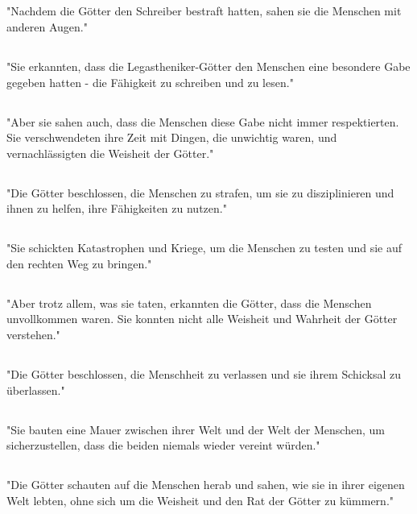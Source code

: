 \documentclass{article}
\begin{document}
\subsection{}
"Nachdem die Götter den Schreiber bestraft hatten, sahen sie die Menschen mit anderen Augen."
\subsection{}
"Sie erkannten, dass die Legastheniker-Götter den Menschen eine besondere Gabe gegeben hatten - die Fähigkeit zu schreiben und zu lesen."
\subsection{}
"Aber sie sahen auch, dass die Menschen diese Gabe nicht immer respektierten. Sie verschwendeten ihre Zeit mit Dingen, die unwichtig waren, und vernachlässigten die Weisheit der Götter."
\subsection{}
"Die Götter beschlossen, die Menschen zu strafen, um sie zu disziplinieren und ihnen zu helfen, ihre Fähigkeiten zu nutzen."
\subsection{}
"Sie schickten Katastrophen und Kriege, um die Menschen zu testen und sie auf den rechten Weg zu bringen."
\subsection{}
"Aber trotz allem, was sie taten, erkannten die Götter, dass die Menschen unvollkommen waren. Sie konnten nicht alle Weisheit und Wahrheit der Götter verstehen."
\subsection{}
"Die Götter beschlossen, die Menschheit zu verlassen und sie ihrem Schicksal zu überlassen."
\subsection{}
"Sie bauten eine Mauer zwischen ihrer Welt und der Welt der Menschen, um sicherzustellen, dass die beiden niemals wieder vereint würden."
\subsection{}
"Die Götter schauten auf die Menschen herab und sahen, wie sie in ihrer eigenen Welt lebten, ohne sich um die Weisheit und den Rat der Götter zu kümmern."
\end{document}
